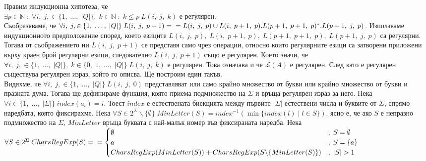 \documentclass[a4paper, 12pt, oneside]{article}
\newcommand{\Lang}{\mathcal{L}}
\newcommand{\N}{\mathbb{N}}
\begin{document}
Правим индукционна хипотеза, че \\
$\exists p \in \N \; : \; \forall i, \; j, \in \{1, \; \dots, \; |Q|\},
\; k \in \N \; : \; k \leq p \; L(i, \; j, \; k)$ е регулярен. \\

Съобразяваме, че $\forall i, \; j, \in \{1, \; \dots, \; |Q|\} \; L(i, \; j, \; p + 1) = \\
= L(i, \; j, \; p) \cup L(i, \; p + 1, \; p).L(p + 1, \; p + 1, \; p)^*.L(p + 1, \; j, \; p)$.
Използваме индукционното предположение според, което езиците
$L(i, \; j, \; p), \; L(i, \; p + 1, \; p), \; L(p + 1, \; p + 1, \; p), \; L(p + 1, \; j, \; p)$
са регулярни. Тогава от съображението ни $L(i, \; j, \; p + 1)$ се представя само чрез операции,
относно които регулярните езици са затворени приложени върху краен брой регулярни езици,
следователно $L(i, \; j, \; p + 1)$ също е регулярен. Което значи, че
$\forall i, \; j, \in \{1, \; \dots, \; |Q|\}, \; k \in \{0, \; 1, \; \dots, \; |Q|\} \; L(i, \; j, \; k)$ е регулярен.
Това означава и че $\Lang(A)$ е регулярен. След като е регулярен съществува регулярен израз, който го описва.
Ще построим един такъв. \\

Видяхме, че $\forall i, \; j, \in \{1, \; \dots, \; |Q|\} \; L(i, \; j, \; 0)$ представляват
или само крайно множество от букви или крайно множество от букви и празната дума. Тогава ще
дефинираме функция, която приема подмножество на $\Sigma$ и връща регулярен израз за него. Нека \\
$\forall i \in \{1, \; \dots, \; |\Sigma|\} \; index(a_i) = i$. Тоест $index$ е
естествената биекцията между първите $|\Sigma|$ естествени числа и буквите от $\Sigma$,
спрямо наредбата, която фиксирахме. Нека
$\forall S \in 2^\Sigma \backslash \{\emptyset\} \; MinLetter(S) = index^{-1}(\min\{index(l) \; | \; l \in S\})$.
ясно е, че ако $S$ е непразно подмножество на $\Sigma$, $MinLetter$ връща буквата
с най-малък номер във фиксираната наредба. Нека \\
$\forall S \in 2^\Sigma \; CharsRegExp(S) = \\
= \begin{cases}
    \emptyset & , \; S = \emptyset \\
    a & , \; S = \{a\} \\
    CharsRegExp(MinLetter(S)) + CharsRegExp(S\backslash\{MinLetter(S)\}) & , \; |S| > 1
\end{cases}$ \\
\end{document}
